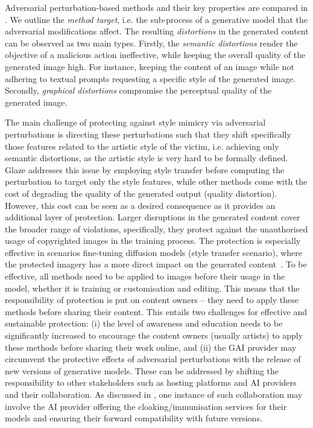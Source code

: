\documentclass[conference,table]{IEEEtran}
\begin{document}


Adversarial perturbation-based methods and their key properties are compared in . 
We outline the \textit{method target}, i.e. the sub-process of a generative model that the adversarial modifications affect.
The resulting \textit{distortions} in the generated content can be observed as two main types. 
Firstly, the \textit{semantic distortions} render the objective of a malicious action ineffective, while keeping the overall quality of the generated image high. 
For instance, keeping the content of an image while not adhering to textual prompts requesting a specific style of the generated image. 
Secondly, \textit{graphical distortions} compromise the perceptual quality of the generated image. 

The main challenge of protecting against style mimicry via adversarial perturbations is directing these perturbations such that they shift specifically those features related to the artistic style of the victim, i.e. achieving only semantic distortions, as the artistic style is very hard to be formally defined. 
Glaze addresses this issue by employing style transfer before computing the perturbation to target only the style features, while other methods come with the cost of degrading the quality of the generated output (quality distortion).
However, this cost can be seen as a desired consequence as it provides an additional layer of protection. 
Larger disruptions in the generated content cover the broader range of violations, specifically, they protect against the unauthorised usage of copyrighted images in the training process. 
The protection is especially effective in scenarios fine-tuning diffusion models (style transfer scenario), where the protected imagery has a more direct impact on the generated content~\cite{liang_mist_2023}.
To be effective, all methods need to be applied to images before their usage in the model, whether it is training or customisation and editing. 
This means that the responsibility of protection is put on content owners -- they need to apply these methods before sharing their content.
This entails two challenges for effective and sustainable protection: (i) the level of awareness and education needs to be significantly increased to encourage the content owners (usually artists) to apply these methods before sharing their work online, and (ii) the GAI provider may circumvent the protective effects of adversarial perturbations with the release of new versions of generative models. 
These can be addressed by shifting the responsibility to other stakeholders such as hosting platforms and AI providers and their collaboration. 
As discussed in \cite{salman_raising_2023}, one instance of such collaboration may involve the AI provider offering the cloaking/immunisation services for their models and ensuring their forward compatibility with future versions.
\end{document}
